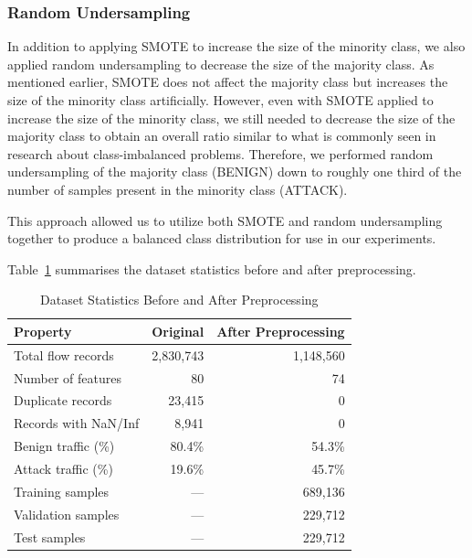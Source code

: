 \subsubsection{Random Undersampling}

In addition to applying SMOTE to increase the size of the minority class, we also applied random undersampling to decrease the size of the majority class. As mentioned earlier, SMOTE does not affect the majority class but increases the size of the minority class artificially. However, even with SMOTE applied to increase the size of the minority class, we still needed to decrease the size of the majority class to obtain an overall ratio similar to what is commonly seen in research about class-imbalanced problems. Therefore, we performed random undersampling of the majority class (BENIGN) down to roughly one third of the number of samples present in the minority class (ATTACK).

This approach allowed us to utilize both SMOTE and random undersampling together to produce a balanced class distribution for use in our experiments.

Table~\ref{tab:preproc_stats_m} summarises the dataset statistics before and after preprocessing.

\begin{table}[H]
\centering
\caption{Dataset Statistics Before and After Preprocessing}
\label{tab:preproc_stats_m}
\begin{tabular}{lrr}
\toprule
\textbf{Property} & \textbf{Original} & \textbf{After Preprocessing} \\
\midrule
Total flow records      & 2{,}830{,}743 & 1{,}148{,}560 \\
Number of features      & 80            & 74            \\
Duplicate records       & 23{,}415      & 0             \\
Records with NaN/Inf    & 8{,}941       & 0             \\
Benign traffic (\%)     & 80.4\%        & 54.3\%        \\
Attack traffic (\%)     & 19.6\%        & 45.7\%        \\
Training samples        & ---           & 689{,}136     \\
Validation samples      & ---           & 229{,}712     \\
Test samples            & ---           & 229{,}712     \\
\bottomrule
\end{tabular}
\end{table}

